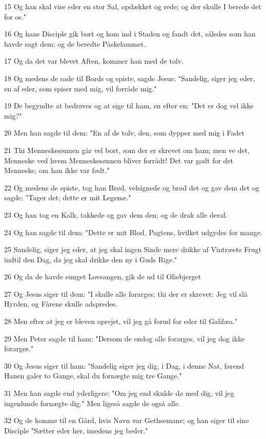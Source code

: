 \par 15 Og han skal vise eder en stor Sal, opdækket og rede; og der skulle I berede det for os."
\par 16 Og hans Disciple gik bort og kom ind i Staden og fandt det, således som han havde sagt dem; og de beredte Påskelammet.
\par 17 Og da det var blevet Aften, kommer han med de tolv.
\par 18 Og medens de sade til Bords og spiste, sagde Jesus: "Sandelig, siger jeg eder, en af eder, som spiser med mig, vil forråde mig."
\par 19 De begyndte at bedrøves og at sige til ham, en efter en: "Det er dog vel ikke mig?"
\par 20 Men han sagde til dem: "En af de tolv, den, som dypper med mig i Fadet
\par 21 Thi Menneskesønnen går vel bort, som der er skrevet om ham; men ve det, Menneske ved hvem Menneskesønnen bliver forrådt! Det var godt for det Menneske, om han ikke var født."
\par 22 Og medens de spiste, tog han Brød, velsignede og brød det og gav dem det og sagde: "Tager det; dette er mit Legeme."
\par 23 Og han tog en Kalk, takkede og gav dem den; og de drak alle deraf.
\par 24 Og han sagde til dem: "Dette er mit Blod, Pagtens, hvilket udgydes for mange.
\par 25 Sandelig, siger jeg eder, at jeg skal ingen Sinde mere drikke af Vintræets Frugt indtil den Dag, da jeg skal drikke den ny i Guds Rige."
\par 26 Og da de havde sunget Lovsangen, gik de ud til Oliebjerget
\par 27 Og Jesus siger til dem: "I skulle alle forarges; thi der er skrevet: Jeg vil slå Hyrden, og Fårene skulle adspredes.
\par 28 Men efter at jeg er bleven oprejst, vil jeg gå forud for eder til Galilæa."
\par 29 Men Peter sagde til ham: "Dersom de endog alle forarges, vil jeg dog ikke forarges."
\par 30 Og Jesus siger til ham: "Sandelig siger jeg dig, i Dag, i denne Nat, førend Hanen galer to Gange, skal du fornægte mig tre Gange."
\par 31 Men han sagde end yderligere: "Om jeg end skulde dø med dig, vil jeg ingenlunde fornægte dig." Men ligeså sagde de også alle.
\par 32 Og de komme til en Gård, hvis Navn var Gethsemane; og han siger til sine Disciple "Sætter eder her, imedens jeg beder."
